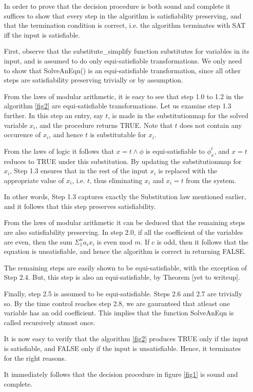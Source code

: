 \documentclass{article}
\newenvironment{proof}[1][Proof]{\begin{trivlist}
\item[\hskip \labelsep {\bfseries #1}]}{\end{trivlist}}
\newcommand{\qed}{\nobreak \ifvmode \relax \else
  \ifdim\lastskip<1.5em \hskip-\lastskip
  \hskip1.5em plus0em minus0.5em \fi \nobreak
  \vrule height0.75em width0.5em depth0.25em\fi}
\begin{document}
\begin{proof}
In order to prove that the decision procedure is both sound and
complete it suffices to show that every step in the algorithm is
satisfiability preserving, and that the termination condition is
correct, i.e. the algorithm terminates with SAT iff the input is
satisfiable.

First, observe that the substitute\_simplify function substitutes for
variables in its input, and is assumed to do only equi-satisfiable
transformations. We only need to show that SolveAnEqn() is an
equi-satisfiable transformation, since all other steps are
satisfiability preserving trivially or by assumption.

From the laws of modular arithmetic, it is easy to see that step 1.0
to 1.2 in the algorithm \ref{fig2} are equi-satisfiable
transformations. Let us examine step 1.3 further. In this step an
entry, say $t$, is made in the substitutionmap for the solved variable
$x_i$, and the procedure returns TRUE. Note that $t$ does not contain
any occurence of $x_i$, and hence $t$ is substitutable for $x_i$.

From the laws of logic it follows that $x=t \wedge \phi$ is
equi-satisfiable to $\phi^t_x$, and $x=t$ reduces to TRUE under this
substitution. By updating the substitutionmap for $x_i$, Step 1.3
ensures that in the rest of the input $x_i$ is replaced with the
appropriate value of $x_i$, i.e. $t$, thus eliminating $x_i$ and
$x_i=t$ from the system.

In other words, Step 1.3 captures exactly the Substitution law
mentioned earlier, and it follows that this step preserves
satisfiability.

From the laws of modular arithmetic it can be deduced that the
remaining steps are also satisfiability preserving. In step 2.0, if
all the coefficient of the variables are even, then the sum
$\Sigma_1^na_ix_i$ is even mod $m$. If c is odd, then it follows that
the equation is unsatisfiable, and hence the algorithm is correct in
returning FALSE.

The remaining steps are easily shown to be equi-satisfiable, with the
exception of Step 2.4. But, this step is also an equi-satisfiable, by
Theorem [yet to writeup].

Finally, step 2.5 is assumed to be equi-satisfiable. Steps 2.6 and 2.7
are trivially so. By the time control reaches step 2.8, we are
gauranteed that atleast one variable has an odd coefficient. This
implies that the function SolveAnEqn is called recursively atmost
once.

It is now easy to verify that the algorithm \ref{fig2} produces TRUE
only if the input is satisfiable, and FALSE only if the input is
unsatisfiable. Hence, it terminates for the right reasons.

It immediately follows that the decision procedure in figure
\ref{fig1} is sound and complete.
\qed
\end{proof}
\end{document}
